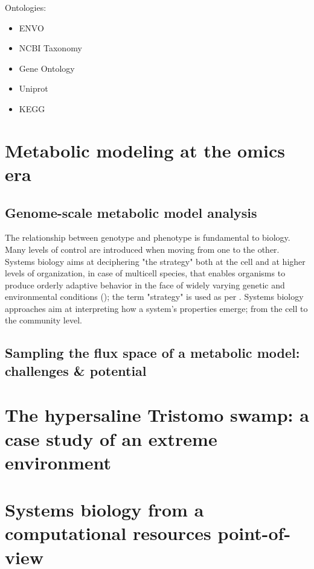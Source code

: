    Ontologies: 

   \begin{itemize}
      \item ENVO
      \item NCBI Taxonomy 
      \item Gene Ontology 
      \item Uniprot
      \item KEGG
   \end{itemize}



\section{Metabolic modeling at the omics era}


\subsection{Genome-scale metabolic model analysis}

   The relationship between genotype and phenotype is fundamental to biology.
   Many levels of control are introduced when moving from one to the other. 
   Systems biology aims at deciphering "the strategy" both at the cell and at higher levels of organization, in case of multicell species, that enables organisms to produce orderly adaptive behavior in the face of widely varying genetic and environmental conditions (\cite{strohman2002maneuvering}); 
   the term "strategy" is used as per \cite{polanyi1968life}.
   Systems biology approaches aim at interpreting how a system's properties emerge; 
   from the cell to the community level.


\subsection{Sampling the flux space of a metabolic model: challenges \& potential}



\section{The hypersaline Tristomo swamp: a case study of an extreme environment}


\section{Systems biology from a computational resources point-of-view}





